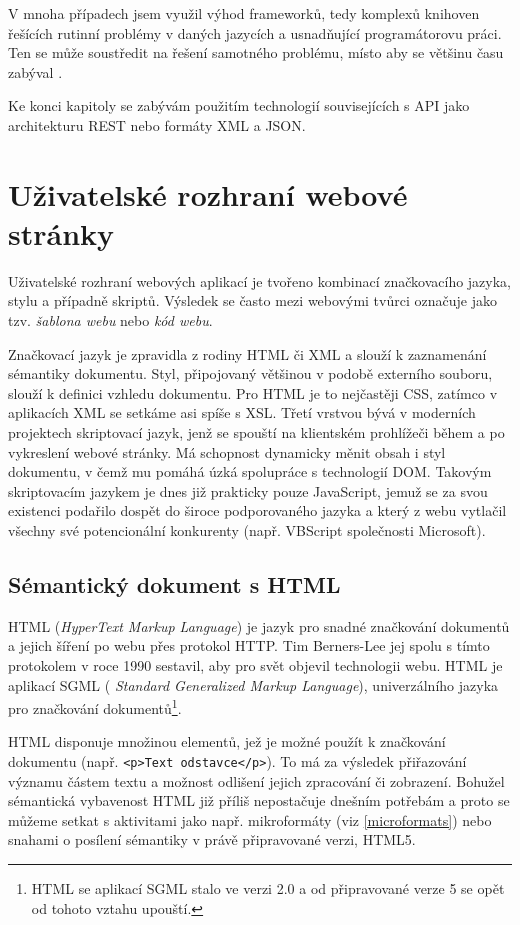 V mnoha případech jsem využil výhod frameworků, tedy komplexů
knihoven řešících rutinní problémy v daných jazycích a usnadňující
programátorovu práci. Ten se může soustředit na řešení samotného
problému, místo aby se většinu času zabýval .

Ke konci kapitoly se zabývám použitím technologií souvisejících s API
jako architekturu REST nebo formáty XML a JSON.

\section{Uživatelské rozhraní webové stránky}
Uživatelské rozhraní webových aplikací je tvořeno kombinací
značkovacího jazyka, stylu a případně skriptů. Výsledek se často mezi
webovými tvůrci označuje jako tzv. {\it šablona webu} nebo {\it kód
webu}.

Značkovací jazyk je zpravidla z rodiny HTML či XML a slouží k
zaznamenání sémantiky dokumentu. Styl, připojovaný většinou v podobě
externího souboru, slouží k definici vzhledu dokumentu. Pro HTML je
to nejčastěji CSS, zatímco v aplikacích XML se setkáme asi spíše s
XSL. Třetí vrstvou bývá v  moderních projektech skriptovací
jazyk, jenž se spouští na klientském prohlížeči během a po vykreslení
webové stránky. Má schopnost dynamicky měnit obsah i styl dokumentu, v
čemž mu pomáhá úzká spolupráce s technologií DOM. Takovým skriptovacím
jazykem je dnes již prakticky pouze JavaScript, jemuž se za svou
existenci podařilo dospět do široce podporovaného jazyka a který z
webu vytlačil všechny své potencionální konkurenty (např. VBScript
společnosti Microsoft).

\subsection{Sémantický dokument s HTML}
HTML ({\it HyperText Markup Language}) je jazyk pro snadné
značkování dokumentů a jejich šíření po webu přes protokol HTTP. Tim
Berners-Lee jej spolu s tímto protokolem v roce 1990 sestavil, aby
pro svět objevil technologii webu. HTML je aplikací SGML ({\it
Standard Generalized Markup Language}), univerzálního jazyka pro značkování
dokumentů\footnote{HTML se aplikací SGML stalo ve verzi 2.0 a od
připravované verze 5 se opět od tohoto vztahu upouští.}.

HTML disponuje množinou elementů, jež je možné použít k značkování
dokumentu (např. {\tt <p>Text odstavce</p>}). To má za výsledek
přiřazování významu částem textu a možnost odlišení jejich zpracování
či zobrazení. Bohužel sémantická vybavenost HTML již příliš
nepostačuje dnešním potřebám a proto se můžeme setkat s aktivitami
jako např. mikroformáty (viz \ref{microformats}) nebo snahami o
posílení sémantiky v právě připravované verzi, HTML5.

